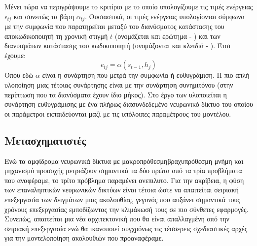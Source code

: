 Μένει τώρα να περιγράψουμε το κριτίριο με το οποίο υπολογίζουμε τις τιμές ενέργειας $\epsilon_{tj}$ και συνεπώς τα βάρη $\alpha_{tj}$. Ουσιαστικά, οι τιμές ενέργειας υπολογίονται σύμφωνα με την συμφωνία που παρατηρείται μεταξύ του διανύσματος κατάστασης του αποκωδικοποιητή τη χρονική στιγμή $t$ (ονομάζεται και ερώτημα - ) και των διανυσμάτων κατάστασης του κωδικοποιητή (ονομάζονται και κλειδιά - ). Έτσι έχουμε:
\[
  e_{tj} = \alpha(s_{t-1}, h_j)
\] Όπου εδώ $\alpha$ είναι η συνάρτηση που μετρά την συμφωνία ή ευθυγράμιση. Η πιο απλή υλοποίηση μιας τέτοιας συνάρτησης είναι με την συνάρτηση συνημιτόνου (στην περίπτωση που τα διανύσματα έχουν ίδιο μήκος). Στο έργο των  \cite{bahdanau2014neural_machine_translation_attention_begins} υλοποιείται η συνάρτηση ευθυγράμισης με ένα πλήρως διασυνδεδεμένο νευρωνικό δίκτυο του οποίου οι παράμετροι εκπαιδεύονται μαζί με τις υπόλοιπες παραμέτρους του μοντέλου.

\subsection{Μετασχηματιστές}
\label{sec:transformers}
Ενώ τα αμφίδρομα νευρωνικά δίκτυα με μακροπρόθεσμη\textendash βραχυπρόθεσμη μνήμη και μηχανισμό προσοχής μετριάζουν σημαντικά τα δύο πρώτα από τα τρία προβλήματα που αναφέραμε, το τρίτο πρόβλημα παραμένει ανεπιλυτο. Για την ακρίβεια, η φύση των επαναληπτικών νευρωνικών δικτύων είναι τέτοια ώστε να απαιτείται σειριακή επεξεργασία των δειγμάτων μιας ακολουθίας, γεγονός που αυξάνει σημαντικά τους χρόνους επεξεργασίας εμποδίζωντας την κλιμάκωσή τους σε πιο σύνθετες εφαρμογές. Συνεπώς, απαιτείται μια νέα αρχιτεκτονική που θα είναι απαλλαγμένη από την σειριακή επεξεργασία ενώ θα ικανοποιεί συγχρόνως τις τέσσερεις σχεδιαστικές αρχές για την μοντελοποίηση ακολουθιών που προαναφέραμε.\par

